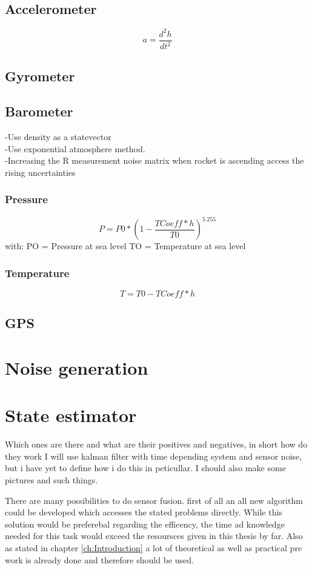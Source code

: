   \subsection{Accelerometer}
  $$a = \frac{d^2h}{dt^2}$$
  \subsection{Gyrometer}
  
  \subsection{Barometer}
  -Use density as a statevector \\
  -Use exponential atmosphere method. \\
  -Increasing the R measurement noise matrix when rocket is ascending access the rising uncertainties
  \subsubsection{Pressure}
  $$P = P0 * (1- \frac{TCoeff*h}{T0})^{5.255}$$
  with: PO = Pressure at sea level
	TO = Temperature at sea level
  \subsubsection{Temperature}
  $$T = T0 - TCoeff*h$$
  \subsection{GPS}
  
  
  \section{Noise generation}
  
  \section{State estimator}
  Which ones are there and what are their positives and negatives, in short how do they work
  I will use kalman filter with time depending system and sensor noise, but i have yet to define how i do this in peticullar.
  I should also make some pictures and such things.
  
  There are many possibilities to do sensor fusion. first of all an all new algorithm could be developed which accesses the 
  stated problems directly. While this solution would be preferebal regarding the efficency, the 
  time ad knowledge needed for this task would exceed the resoursces given in this thesis by far.
  Also as stated in chapter \ref{ch:Introduction} a lot of theoretical as well as practical pre work is
  already done and therefore should be used. 
  
